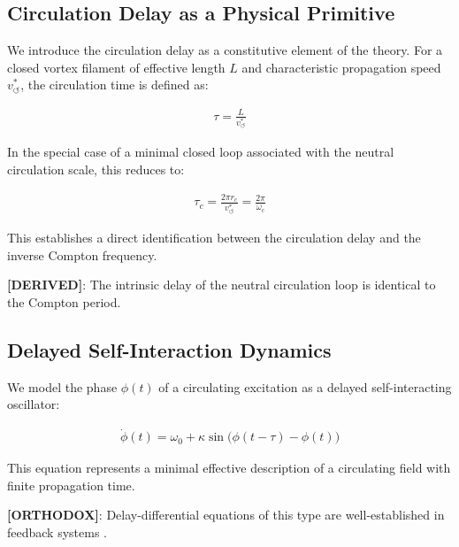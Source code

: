 \documentclass[11pt]{article}
\theoremstyle{definition}
\theoremstyle{plain}
\theoremstyle{remark}
\newcommand{\rc}{{r_c}}
\newcommand{\vchar}{v_{\!\boldsymbol{\circlearrowleft}}^{\ast}}
\begin{document}
    \subsection{Circulation Delay as a Physical Primitive}
        
        We introduce the circulation delay as a constitutive element of the theory.
        For a closed vortex filament of effective length $L$ and characteristic propagation speed $\vchar$, the circulation time is defined as:
        
        \begin{align}
            \tau = \frac{L}{\vchar}
            \label{eq:delay_time}
        \end{align}
        
        In the special case of a minimal closed loop associated with the neutral circulation scale, this reduces to:
        
        \begin{align}
            \tau_c = \frac{2\pi \rc}{\vchar} = \frac{2\pi}{\omega_c}
            \label{eq:compton_delay}
        \end{align}
        
        This establishes a direct identification between the circulation delay and the inverse Compton frequency.
        
        \textbf{[DERIVED]}: The intrinsic delay of the neutral circulation loop is identical to the Compton period.
    
    \subsection{Delayed Self-Interaction Dynamics}
        
        We model the phase $\phi(t)$ of a circulating excitation as a delayed self-interacting oscillator:
        
        \begin{align}
            \dot{\phi}(t) = \omega_0 + \kappa \sin\big(\phi(t - \tau) - \phi(t)\big)
            \label{eq:delay_phase}
        \end{align}
        
        This equation represents a minimal effective description of a circulating field with finite propagation time.
        
        \textbf{[ORTHODOX]}: Delay-differential equations of this type are well-established in feedback systems \cite{SST_delay_basic}.
    
\end{document}
